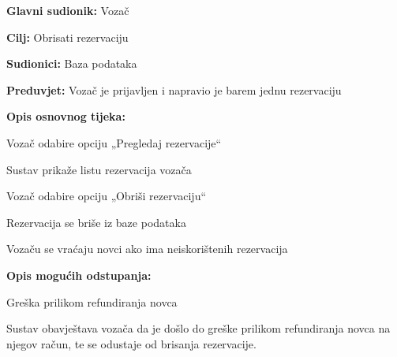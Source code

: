 							
					\noindent {}
					\begin{packed_item}
						
						\item  \textbf{Glavni sudionik: } Vozač
						\item  \textbf{Cilj:} Obrisati rezervaciju
						\item  \textbf{Sudionici:} Baza podataka
						\item  \textbf{Preduvjet:} Vozač je prijavljen i napravio je barem jednu rezervaciju
						\item  \textbf{Opis osnovnog tijeka:}
						
						\item[] \begin{packed_enum}
							\item Vozač odabire opciju „Pregledaj rezervacije“
							\item Sustav prikaže listu rezervacija vozača
							\item Vozač odabire opciju „Obriši rezervaciju“
							\item Rezervacija se briše iz baze podataka
							\item Vozaču se vraćaju novci ako ima neiskorištenih rezervacija
						\end{packed_enum}
						
						\item  \textbf{Opis mogućih odstupanja:}
						
						\item[] \begin{packed_item}
							
							\item[4.a]  Greška prilikom refundiranja novca
							\item[] \begin{packed_enum}
								
								\item Sustav obavještava vozača da je došlo do greške prilikom refundiranja novca na njegov račun, te se odustaje od brisanja rezervacije.
								
							\end{packed_enum}
						\end{packed_item}
						
					\end{packed_item}
					\noindent {}
